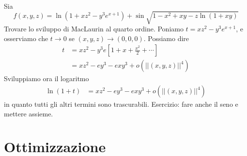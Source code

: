 \documentclass[a4paper]{article}
\begin{document}
\begin{radioactive}
\begin{snippetexample}{}
    Sia \[
        f(x,y,z) = \ln(1 + xz^2 - y^3 e^{x+1})
        + \sin \sqrt{1 - x^2 + xy - z\ln(1 + xy)}
    \]
    Trovare lo sviluppo di MacLaurin al quarto ordine.
    Poniamo \(t = xz^2 - y^3 e^{x+1}\), e osserviamo che \(t \to 0\)
    se \((x,y,z) \to (0,0,0)\). Possiamo dire
    \begin{align*}
        t &= xz^2 - y^3 e\left[
            1 + x + \frac{x^2}{2} + \cdots
        \right] \\
        &= xz^2 - ey^3 - exy^3 + o(||(x,y,z)||^4)
    \end{align*}
    Sviluppiamo ora il logaritmo
    \begin{align*}
        \ln(1 + t) &=
        xz^2 - ey^3 - exy^3 + o(||(x,y,z)||^4)
    \end{align*}
    in quanto tutti gli altri termini sono trascurabili.
    Esercizio: fare anche il seno e mettere assieme.
\end{snippetexample}
\end{radioactive}

\pagebreak

\section{Ottimizzazione}
\end{document}
